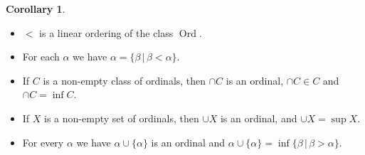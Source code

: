 \documentclass{article}
\theoremstyle{definition}
\newtheorem{crly}[thm]{Corollary}
\DeclareMathOperator{\Ord}{Ord}
\begin{document}
\newpage

\begin{crly}
    \hfill
    \begin{itemize}
        \item $<$ is a linear ordering of the class $\Ord$.
        \item For each $\alpha$ we have $\alpha =  \{\beta \, | \, \beta < \alpha\}$.
        \item If $C$ is a non-empty class of ordinals, then $\cap C$ is an ordinal, $\cap C \in C$ and $\cap C = \inf C$.
        \item If $X$ is a non-empty set of ordinals, then $\cup X$ is an ordinal, and $\cup X = \sup X$.
        \item For every $\alpha$ we have $\alpha \cup \{\alpha\}$ is an ordinal and $\alpha \cup \{\alpha\}  = \inf \{\beta \, | \, \beta > \alpha\}$. 
    \end{itemize}
\end{crly}
\end{document}
